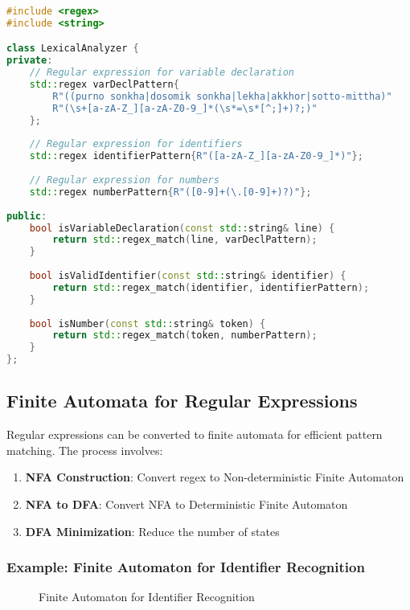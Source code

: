 \documentclass[12pt,a4paper]{article}
\begin{document}
\begin{lstlisting}[language=C++, caption=Regular Expression Implementation for Variable Declaration]
#include <regex>
#include <string>

class LexicalAnalyzer {
private:
    // Regular expression for variable declaration
    std::regex varDeclPattern{
        R"((purno sonkha|dosomik sonkha|lekha|akkhor|sotto-mittha)"
        R"(\s+[a-zA-Z_][a-zA-Z0-9_]*(\s*=\s*[^;]+)?;)"
    };
    
    // Regular expression for identifiers
    std::regex identifierPattern{R"([a-zA-Z_][a-zA-Z0-9_]*)"};
    
    // Regular expression for numbers
    std::regex numberPattern{R"([0-9]+(\.[0-9]+)?)"};
    
public:
    bool isVariableDeclaration(const std::string& line) {
        return std::regex_match(line, varDeclPattern);
    }
    
    bool isValidIdentifier(const std::string& identifier) {
        return std::regex_match(identifier, identifierPattern);
    }
    
    bool isNumber(const std::string& token) {
        return std::regex_match(token, numberPattern);
    }
};
\end{lstlisting}

\subsection{Finite Automata for Regular Expressions}

Regular expressions can be converted to finite automata for efficient pattern matching. The process involves:

\begin{enumerate}
    \item \textbf{NFA Construction}: Convert regex to Non-deterministic Finite Automaton
    \item \textbf{NFA to DFA}: Convert NFA to Deterministic Finite Automaton
    \item \textbf{DFA Minimization}: Reduce the number of states
\end{enumerate}

\subsubsection{Example: Finite Automaton for Identifier Recognition}

\begin{figure}[H]
    \centering
    \caption{Finite Automaton for Identifier Recognition}
\end{figure}
\end{document}
